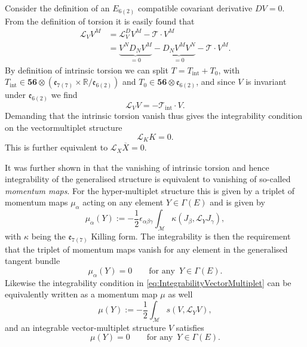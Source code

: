 Consider the definition of an $E_{6(2)}$ compatible covariant derivative $DV=0$. From the definition of torsion it is easily found that 
\begin{equation}
    \begin{aligned}
    \mathscr{L}_VV^M &= \mathscr{L}^D_VV^M-\mathscr{T}\cdot V^M\\
                    &= \underbrace{V^ND_NV^M}_{=0}-\underbrace{D_NV^MV^N}_{=0}-\mathscr{T}\cdot V^M.
    \end{aligned}
\end{equation}
By definition of intrinsic torsion we can split $T=T_{\text{int}}+T_0$, with $T_{\text{int}}\in \mathbf{56}\otimes (\mathfrak{e}_{7(7)}\times\mathbb{R}/\mathfrak{e}_{6(2)})$ and $T_0\in \mathbf{56}\otimes\mathfrak{e}_{6(2)}$, and since $V$ is invariant under $\mathfrak{e}_{6(2)}$ we find 
\begin{equation}
    \mathscr{L}_V V = -\mathscr{T}_{\text{int}}\cdot V.
\end{equation}
Demanding that the intrinsic torsion vanish thus gives the integrability condition on the vectormultiplet structure 
\begin{equation}\label{eq:IntegrabilityVectorMultiplet}
    \mathscr{L}_K K = 0.
\end{equation}
This is further equivalent to $\mathscr{L}_X\overbar{X}=0$. 

It was further shown in \cite{Ashmore:2015joa} that the vanishing of intrinsic torsion and hence integrability of the generalised structure is equivalent to vanishing of so-called \emph{momentum maps}. For the hyper-multiplet structure this is given by a triplet of momentum maps $\mu_\alpha$ acting on any element $Y\in\Gamma(E)$ and is given by 
\begin{equation}
    \mu_\alpha(Y):= -\frac{1}{2}\epsilon_{\alpha\beta\gamma}\int_\mathcal{M}\kappa(J_\beta,\mathscr{L}_YJ_\gamma),
\end{equation}
with $\kappa$ being the $\mathfrak{e}_{7(7)}$ Killing form. The integrability is then the requirement that the triplet of momentum maps vanish for any element in the generalised tangent bundle
\begin{equation}
    \mu_\alpha(Y) = 0\qquad \text{for any }\, Y\in\Gamma(E).
\end{equation}
Likewise the integrability condition in \eqref{eq:IntegrabilityVectorMultiplet} can be equivalently written as a momentum map $\mu$ as well
\begin{equation}
    \mu(Y) := -\frac{1}{2}\int_\mathcal{M}s(V,\mathscr{L}_YV),
\end{equation}
and an integrable vector-multiplet structure $V$ satisfies 
\begin{equation}
    \mu(Y) = 0\qquad \text{for any }\, Y\in\Gamma(E).
\end{equation}

